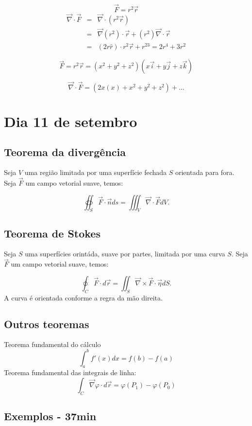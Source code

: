 \documentclass[a4paper,10pt]{book}
\begin{document}
\section{}
$$\vec{F}=r^2\vec{r}$$
\begin{eqnarray*}\vec{\nabla}\cdot\vec{F}&=&\vec{\nabla}\cdot(r^2\vec{r})\\
&=&\vec{\nabla}(r^2)\cdot\vec{r}+(r^2)\vec{\nabla}\cdot\vec{r}\\
&=&(2r\hat{r})\cdot r^2\vec{r}+r^23=2r^4+3r^2
\end{eqnarray*}


$$\vec{F}=r^2\vec{r}=(x^2+y^2+z^2)(x\vec{i}+y\vec{j}+z\vec{k})$$

$$\vec{\nabla}\cdot\vec{F}=(2x(x)+x^2+y^2+z^2)+...$$

\chapter{Dia 11 de setembro}

\section{Teorema da divergência}
Seja $V$ uma região limitada por uma superfície fechada $S$ orientada para fora. Seja $\vec{F}$ um campo vetorial suave, temos:

$$\oiint_S\vec{F}\cdot \vec{n}ds = \iiint_V \vec{\nabla}\cdot \vec{F}dV.$$


\section{Teorema de Stokes}

Seja $S$ uma superfícies orintáda, suave por partes, limitada por uma curva $S$.
Seja $\vec{F}$ um campo vetorial suave, temos:

$$\oint_C\vec{F}\cdot d\vec{r} = \iint_S \vec{\nabla}\times \vec{F}\cdot \vec{\eta} dS.$$
A curva é orientada conforme a regra da mão direita.

\section{Outros teoremas}

Teorema fundamental do cálculo
$$\int_a^bf'(x)dx = f(b)-f(a)$$
Teorema fundamental das integrais de linha:
$$\int_C\vec{\nabla}\varphi \cdot d\vec{r}=\varphi(P_1)-\varphi(P_0) $$

\section{Exemplos - 37min}
\end{document}
